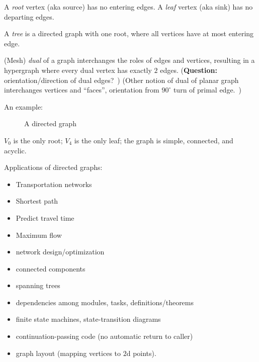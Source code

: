 \documentclass[11pt,openany]{article}
\begin{document}
A \textit{root} vertex (aka source) has no entering edges.
A \textit{leaf} vertex (aka sink) has no departing edges.

A \textit{tree} is a directed graph with one root, 
where all vertices have at most entering edge.

(Mesh) \textit{dual} of a graph interchanges the roles of edges 
and vertices, resulting in a hypergraph where every dual vertex
has exactly $2$ edges. 
(\textbf{Question:} orientation/direction of dual edges?~\cite{rusnak2012oriented})
(Other notion of dual of planar graph interchanges vertices and ``faces'',
orientation from $90^{\circ}$ turn of primal edge.~\cite{wiki:Dual_graph})

An example:
\begin{figure}
\centering
{}

\caption{A directed graph}
\label{fig:a_digraph}
\end{figure}

$V_0$ is the only root; $V_4$ is the only leaf;
the graph is simple, connected, and acyclic.

Applications of directed graphs:~\cite{clrs-2009}
\begin{itemize}
  \item Transportation networks
  \item Shortest path
  \item Predict travel time
  \item Maximum flow
  \item network design/optimization
  \item connected components
  \item spanning trees
  \item dependencies among modules, tasks, definitions/theorems
  \item finite state machines, state-transition diagrams
  \item continuation-passing code (no automatic return to caller)
  \item graph layout (mapping vertices to $2$d points).
\end{itemize}
\end{document}
